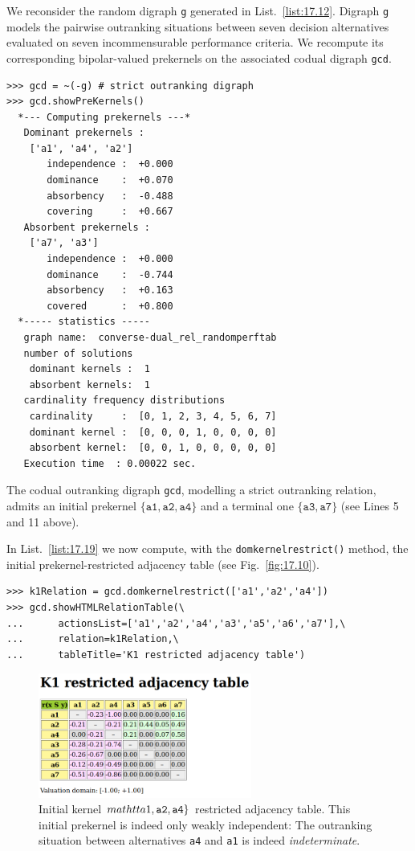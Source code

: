 \noindent We reconsider the random digraph \texttt{g} generated in List.~\vref{list:17.12}. Digraph \texttt{g} models the pairwise outranking situations between seven decision alternatives evaluated on seven incommensurable performance criteria. We recompute its corresponding bipolar-valued prekernels on the associated codual digraph \texttt{gcd}.
\begin{lstlisting}
>>> gcd = ~(-g) # strict outranking digraph
>>> gcd.showPreKernels()
  *--- Computing prekernels ---*
   Dominant prekernels :
    ['a1', 'a4', 'a2']
       independence :  +0.000
       dominance    :  +0.070
       absorbency   :  -0.488
       covering     :  +0.667
   Absorbent prekernels :
    ['a7', 'a3']
       independence :  +0.000
       dominance    :  -0.744
       absorbency   :  +0.163
       covered      :  +0.800
  *----- statistics -----
   graph name:  converse-dual_rel_randomperftab
   number of solutions
    dominant kernels :  1
    absorbent kernels:  1
   cardinality frequency distributions
    cardinality     :  [0, 1, 2, 3, 4, 5, 6, 7]
    dominant kernel :  [0, 0, 0, 1, 0, 0, 0, 0]
    absorbent kernel:  [0, 0, 1, 0, 0, 0, 0, 0]
   Execution time  : 0.00022 sec.
\end{lstlisting}
The codual outranking digraph \texttt{gcd}, modelling a strict outranking relation, admits an initial prekernel $\{\mathtt{a1}, \mathtt{a2}, \mathtt{a4}\}$ and a terminal one $\{\mathtt{a3}, \mathtt{a7}\}$ (see Lines 5 and 11 above).

In List.~\vref{list:17.19} we now compute, with the \texttt{domkernelrestrict()} method, the initial prekernel-restricted adjacency table (see Fig.~\vref{fig:17.10}).
\begin{lstlisting}[caption={Computing a dominant prekernel restricted adjancecy table},label=list:17.19]
>>> k1Relation = gcd.domkernelrestrict(['a1','a2','a4'])
>>> gcd.showHTMLRelationTable(\
...      actionsList=['a1','a2','a4','a3','a5','a6','a7'],\
...      relation=k1Relation,\
...      tableTitle='K1 restricted adjacency table')
\end{lstlisting}
\begin{figure}[h]
\sidecaption[t]
\includegraphics[width=7cm]{Figures/17-10-k1restricted.png}
\caption{Initial kernel $\\mathtt{a1}, \mathtt{a2}, \mathtt{a4}\}$ restricted adjacency table. This initial prekernel is indeed only weakly independent: The outranking situation between alternatives \texttt{a4} and \texttt{a1} is indeed \emph{indeterminate}. }
\label{fig:17.10}       %
\end{figure}

